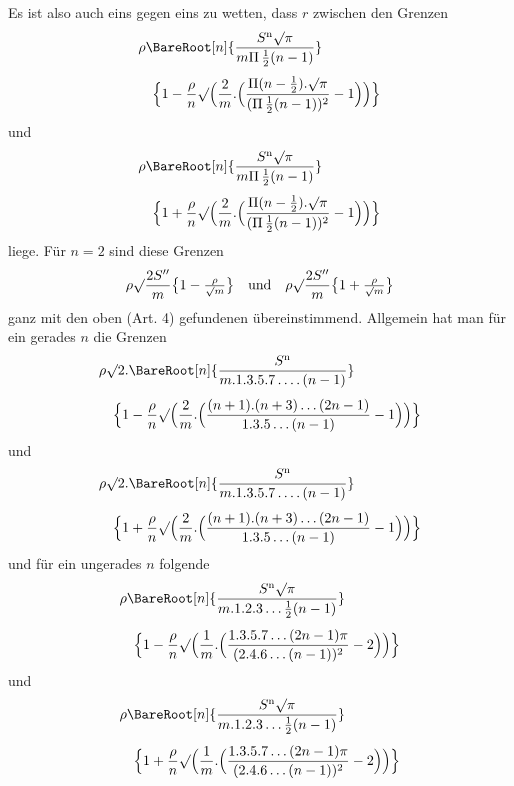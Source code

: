 Es ist also auch eins gegen eins zu wetten, dass \(r\) zwischen den Grenzen
\[
\begin{aligned}
&\rho\BareRoot[n]{\frac{S^{\mathrm n}\surd\pi}{m\Pi\,\frac12(n-1)}}\\[3pt]
&\quad\Bigl\{1-\frac\rho n\surd\Bigl(\frac2m.\Bigl(\frac{\Pi(n-\frac12).\surd\pi}{(\Pi\,\frac12(n-1))^2}-1\Bigr)\Bigr)\Bigr\}
\end{aligned}
\]
und
\[
\begin{aligned}
&\rho\BareRoot[n]{\frac{S^{\mathrm n}\surd\pi}{m\Pi\,\frac12(n-1)}}\\[3pt]
&\quad\Bigl\{1+\frac\rho n\surd\Bigl(\frac2m.\Bigl(\frac{\Pi(n-\frac12).\surd\pi}{(\Pi\,\frac12(n-1))^2}-1\Bigr)\Bigr)\Bigr\}
\end{aligned}
\]
liege. Für \(n=2\) sind diese Grenzen
\[
\rho\surd\frac{2S''}{m}\bigl\{1-\tfrac\rho{\surd m}\bigr\}\quad\text{und}\quad
\rho\surd\frac{2S''}{m}\bigl\{1+\tfrac\rho{\surd m}\bigr\}
\]
ganz mit den oben (Art. 4) gefundenen übereinstimmend. Allgemein hat man für ein gerades \(n\) die Grenzen
\[
\begin{aligned}
&\rho\surd2.\BareRoot[n]{\frac{S^{\mathrm n}}{m.1.3.5.7\, .\,.\,.\,.\,(n-1)}}\\[4pt]
&\quad\Bigl\{1-\frac\rho n\surd\Bigl(\frac2m.\Bigl(\frac{(n+1).(n+3)\, .\,.\,.\,(2n-1)}{1.3.5\, .\,.\,.\,(n-1)}-1\Bigr)\Bigr)\Bigr\}
\end{aligned}
\]
und
\[
\begin{aligned}
&\rho\surd2.\BareRoot[n]{\frac{S^{\mathrm n}}{m.1.3.5.7\, .\,.\,.\,.\,(n-1)}}\\[4pt]
&\quad\Bigl\{1+\frac\rho n\surd\Bigl(\frac2m.\Bigl(\frac{(n+1).(n+3)\, .\,.\,.\,(2n-1)}{1.3.5\, .\,.\,.\,(n-1)}-1\Bigr)\Bigr)\Bigr\}
\end{aligned}
\]
und für ein ungerades \(n\) folgende
\[
\begin{aligned}
&\rho\BareRoot[n]{\frac{S^{\mathrm n}\surd\pi}{m.1.2.3\, .\,.\,.\,\frac12(n-1)}}\\[4pt]
&\quad\Bigl\{1-\frac\rho n\surd\Bigl(\frac1m.\Bigl(\frac{1.3.5.7\, .\,.\,.\,(2n-1)\pi}{(2.4.6\, .\,.\,.\,(n-1))^2}-2\Bigr)\Bigr)\Bigr\}
\end{aligned}
\]
und
\[
\begin{aligned}
&\rho\BareRoot[n]{\frac{S^{\mathrm n}\surd\pi}{m.1.2.3\, .\,.\,.\,\frac12(n-1)}}\\[4pt]
&\quad\Bigl\{1+\frac\rho n\surd\Bigl(\frac1m.\Bigl(\frac{1.3.5.7\, .\,.\,.\,(2n-1)\pi}{(2.4.6\, .\,.\,.\,(n-1))^2}-2\Bigr)\Bigr)\Bigr\}
\end{aligned}
\]

